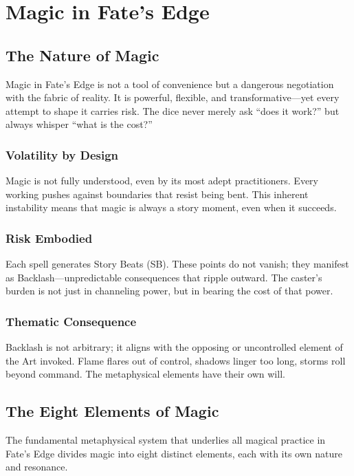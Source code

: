 \documentclass[11pt]{report}
\begin{document}
\chapter{Magic in Fate's Edge}

\section{The Nature of Magic}

Magic in Fate's Edge is not a tool of convenience but a dangerous negotiation with the fabric of reality. It is powerful, flexible, and transformative—yet every attempt to shape it carries risk. The dice never merely ask ``does it work?'' but always whisper ``what is the cost?''

\subsection{Volatility by Design}
Magic is not fully understood, even by its most adept practitioners. Every working pushes against boundaries that resist being bent. This inherent instability means that magic is always a story moment, even when it succeeds.

\subsection{Risk Embodied}
Each spell generates Story Beats (SB). These points do not vanish; they manifest as Backlash—unpredictable consequences that ripple outward. The caster's burden is not just in channeling power, but in bearing the cost of that power.

\subsection{Thematic Consequence}
Backlash is not arbitrary; it aligns with the opposing or uncontrolled element of the Art invoked. Flame flares out of control, shadows linger too long, storms roll beyond command. The metaphysical elements have their own will.

\section{The Eight Elements of Magic}

The fundamental metaphysical system that underlies all magical practice in Fate's Edge divides magic into eight distinct elements, each with its own nature and resonance.
\end{document}
